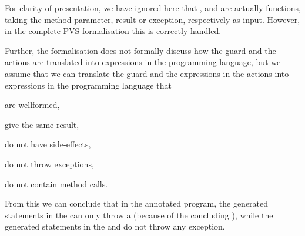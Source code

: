 For clarity of presentation, we have ignored here that \preset, \postset and
\excset are actually functions, taking the method parameter, result or
exception, respectively as input. However, in the complete PVS
formalisation this is correctly handled.

Further, the formalisation does not formally discuss how the guard and
the actions are translated into expressions in the programming
language, but we assume that we can translate the guard and the
expressions in the actions into expressions in the programming
language that
\begin{inparaenum}
\item are wellformed,
\item give the same result,
\item do not have side-effects,
\item do not throw exceptions,
\item do not contain method calls.
\end{inparaenum}
From this we can conclude that in the annotated program, the generated
statements in the \preset can only throw a \JMLExc (because of the
concluding \Assert), while the generated statements in the \postset
and \excset do not throw any exception.

